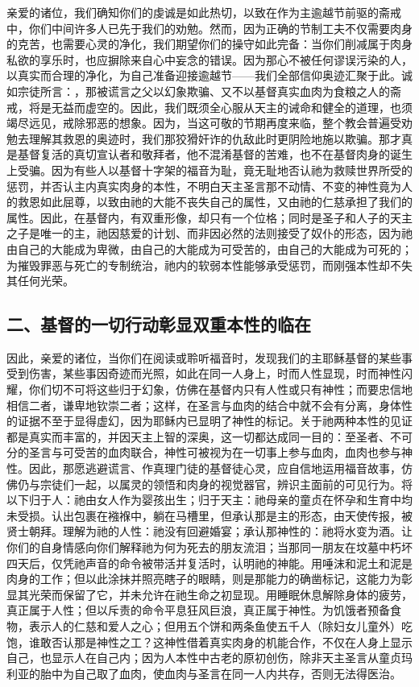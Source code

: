 亲爱的诸位，我们确知你们的虔诚是如此热切，以致在作为主逾越节前驱的斋戒中，你们中间许多人已先于我们的劝勉。然而，因为正确的节制工夫不仅需要肉身的克苦，也需要心灵的净化，我们期望你们的操守如此完备：当你们削减属于肉身私欲的享乐时，也应摒除来自心中妄念的错误。因为那心不被任何谬误污染的人，以真实而合理的净化，为自己准备迎接逾越节——我们全部信仰奥迹汇聚于此。诚如宗徒所言：，那被谎言之父以幻象欺骗、又不以基督真实血肉为食粮之人的斋戒，将是无益而虚空的。因此，我们既须全心服从天主的诫命和健全的道理，也须竭尽远见，戒除邪恶的想象。因为，当这可敬的节期再度来临，整个教会普遍受劝勉去理解其救恩的奥迹时，我们那狡猾奸诈的仇敌此时更阴险地施以欺骗。那才真是基督复活的真切宣认者和敬拜者，他不混淆基督的苦难，也不在基督肉身的诞生上受骗。因为有些人以基督十字架的福音为耻，竟无耻地否认祂为救赎世界所受的惩罚，并否认主内真实肉身的本性，不明白天主圣言那不动情、不变的神性竟为人的救恩如此屈尊，以致由祂的大能不丧失自己的属性，又由祂的仁慈承担了我们的属性。因此，在基督内，有双重形像，却只有一个位格；同时是圣子和人子的天主之子是唯一的主，祂因慈爱的计划、而非因必然的法则接受了奴仆的形态，因为祂由自己的大能成为卑微，由自己的大能成为可受苦的，由自己的大能成为可死的；为摧毁罪恶与死亡的专制统治，祂内的软弱本性能够承受惩罚，而刚强本性却不失其任何光荣。\par


\subsection{二、基督的一切行动彰显双重本性的临在}

因此，亲爱的诸位，当你们在阅读或聆听福音时，发现我们的主耶稣基督的某些事受到伤害，某些事因奇迹而光照，如此在同一人身上，时而人性显现，时而神性闪耀，你们切不可将这些归于幻象，仿佛在基督内只有人性或只有神性；而要忠信地相信二者，谦卑地钦崇二者；这样，在圣言与血肉的结合中就不会有分离，身体性的证据不至于显得虚幻，因为耶稣内已显明了神性的标记。关于祂两种本性的见证都是真实而丰富的，并因天主上智的深奥，这一切都达成同一目的：至圣者、不可分的圣言与可受苦的血肉联合，神性可被视为在一切事上参与血肉，血肉也参与神性。因此，那愿逃避谎言、作真理门徒的基督徒心灵，应自信地运用福音故事，仿佛仍与宗徒们一起，以属灵的领悟和肉身的视觉器官，辨识主面前的可见行为。将以下归于人：祂由女人作为婴孩出生；归于天主：祂母亲的童贞在怀孕和生育中均未受损。认出包裹在襁褓中，躺在马槽里，但承认那是主的形态，由天使传报，被贤士朝拜。理解为祂的人性：祂没有回避婚宴；承认那神性的：祂将水变为酒。让你们的自身情感向你们解释祂为何为死去的朋友流泪；当那同一朋友在坟墓中朽坏四天后，仅凭祂声音的命令被带活并复活时，认明祂的神能。用唾沫和泥土和泥是肉身的工作；但以此涂抹并照亮瞎子的眼睛，则是那能力的确凿标记，这能力为彰显其光荣而保留了它，并未允许在祂生命之初显现。用睡眠休息解除身体的疲劳，真正属于人性；但以斥责的命令平息狂风巨浪，真正属于神性。为饥饿者预备食物，表示人的仁慈和爱人之心；但用五个饼和两条鱼使五千人（除妇女儿童外）吃饱，谁敢否认那是神性之工？这神性借着真实肉身的机能合作，不仅在人身上显示自己，也显示人在自己内；因为人本性中古老的原初创伤，除非天主圣言从童贞玛利亚的胎中为自己取了血肉，使血肉与圣言在同一人内共存，否则无法得医治。\par

